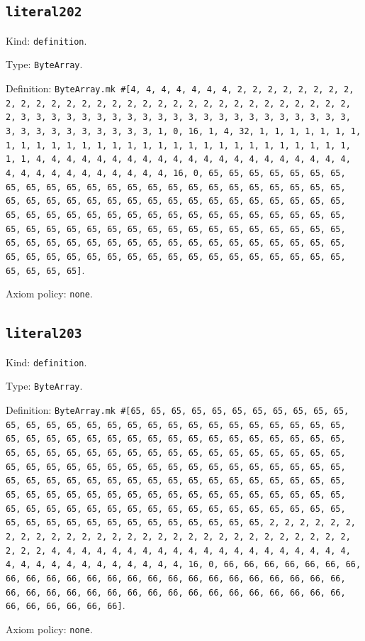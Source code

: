 \documentclass[11pt]{article}
\begin{document}
\subsection*{\texttt{literal202}}
\noindent Kind: \texttt{definition}.\par
\noindent Type: \texttt{ByteArray}.\par
\noindent Definition: \texttt{ByteArray.mk \#[4, 4, 4, 4, 4, 4, 4, 2, 2, 2, 2, 2, 2, 2, 2, 2, 2, 2, 2, 2, 2, 2, 2, 2, 2, 2, 2, 2, 2, 2, 2, 2, 2, 2, 2, 2, 2, 2, 2, 3, 3, 3, 3, 3, 3, 3, 3, 3, 3, 3, 3, 3, 3, 3, 3, 3, 3, 3, 3, 3, 3, 3, 3, 3, 3, 3, 3, 3, 3, 3, 3, 1, 0, 16, 1, 4, 32, 1, 1, 1, 1, 1, 1, 1, 1, 1, 1, 1, 1, 1, 1, 1, 1, 1, 1, 1, 1, 1, 1, 1, 1, 1, 1, 1, 1, 1, 1, 1, 1, 4, 4, 4, 4, 4, 4, 4, 4, 4, 4, 4, 4, 4, 4, 4, 4, 4, 4, 4, 4, 4, 4, 4, 4, 4, 4, 4, 4, 4, 4, 4, 4, 16, 0, 65, 65, 65, 65, 65, 65, 65, 65, 65, 65, 65, 65, 65, 65, 65, 65, 65, 65, 65, 65, 65, 65, 65, 65, 65, 65, 65, 65, 65, 65, 65, 65, 65, 65, 65, 65, 65, 65, 65, 65, 65, 65, 65, 65, 65, 65, 65, 65, 65, 65, 65, 65, 65, 65, 65, 65, 65, 65, 65, 65, 65, 65, 65, 65, 65, 65, 65, 65, 65, 65, 65, 65, 65, 65, 65, 65, 65, 65, 65, 65, 65, 65, 65, 65, 65, 65, 65, 65, 65, 65, 65, 65, 65, 65, 65, 65, 65, 65, 65, 65, 65, 65, 65, 65, 65, 65, 65, 65, 65, 65, 65, 65, 65]}.\par
\noindent Axiom policy: \texttt{none}.\par
\subsection*{\texttt{literal203}}
\noindent Kind: \texttt{definition}.\par
\noindent Type: \texttt{ByteArray}.\par
\noindent Definition: \texttt{ByteArray.mk \#[65, 65, 65, 65, 65, 65, 65, 65, 65, 65, 65, 65, 65, 65, 65, 65, 65, 65, 65, 65, 65, 65, 65, 65, 65, 65, 65, 65, 65, 65, 65, 65, 65, 65, 65, 65, 65, 65, 65, 65, 65, 65, 65, 65, 65, 65, 65, 65, 65, 65, 65, 65, 65, 65, 65, 65, 65, 65, 65, 65, 65, 65, 65, 65, 65, 65, 65, 65, 65, 65, 65, 65, 65, 65, 65, 65, 65, 65, 65, 65, 65, 65, 65, 65, 65, 65, 65, 65, 65, 65, 65, 65, 65, 65, 65, 65, 65, 65, 65, 65, 65, 65, 65, 65, 65, 65, 65, 65, 65, 65, 65, 65, 65, 65, 65, 65, 65, 65, 65, 65, 65, 65, 65, 65, 65, 65, 65, 65, 65, 65, 65, 65, 65, 65, 65, 65, 65, 65, 65, 65, 65, 65, 65, 2, 2, 2, 2, 2, 2, 2, 2, 2, 2, 2, 2, 2, 2, 2, 2, 2, 2, 2, 2, 2, 2, 2, 2, 2, 2, 2, 2, 2, 2, 2, 2, 4, 4, 4, 4, 4, 4, 4, 4, 4, 4, 4, 4, 4, 4, 4, 4, 4, 4, 4, 4, 4, 4, 4, 4, 4, 4, 4, 4, 4, 4, 4, 4, 16, 0, 66, 66, 66, 66, 66, 66, 66, 66, 66, 66, 66, 66, 66, 66, 66, 66, 66, 66, 66, 66, 66, 66, 66, 66, 66, 66, 66, 66, 66, 66, 66, 66, 66, 66, 66, 66, 66, 66, 66, 66, 66, 66, 66, 66, 66, 66, 66]}.\par
\noindent Axiom policy: \texttt{none}.\par
\end{document}
